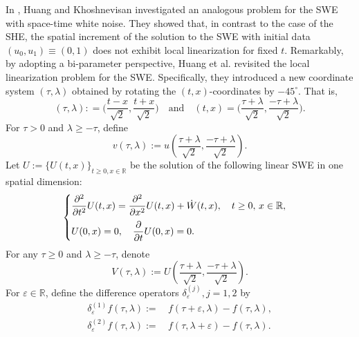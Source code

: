 \documentclass[11pt,reqno]{amsart}
\numberwithin{equation}{section}
\newcommand{\1}{{\bf 1}}
\newcommand{\2}{{\bf 2}}
\begin{document}
  
  
In \cite{HK2016}, Huang and Khoshnevisan  investigated  an analogous problem  for the  SWE with space-time white noise.  They showed that, in contrast to the case of the SHE,  the spatial increment of the  solution to  the SWE with initial data $(u_0, u_1) \equiv (0, 1)$ does not  exhibit local linearization  for fixed $t$.   Remarkably, by adopting a bi-parameter perspective, Huang  et al.   \cite{HOO2024}   revisited the local linearization problem  for  the SWE.   Specifically, they introduced  a new coordinate system $(\tau, \lambda)$ obtained by rotating the $(t, x)$-coordinates by $-45^\circ$.  That is, 
\begin{equation}\label{eq transform}
(\tau, \lambda): = \Big(\frac{t-x}{\sqrt{2}}, \frac{t+x}{\sqrt{2}}\Big) \quad \text{and} \quad (t, x) 
= \Big( \frac{\tau+\lambda}{\sqrt{2}}, 
\frac{-\tau+\lambda}{\sqrt{2}} \Big). 
\end{equation}
For $\tau>0$ and $\lambda\ge -\tau$,  define 
\begin{equation}\label{SWE 2}
v(\tau, \lambda) := u\left(\frac{\tau+\lambda}{\sqrt{2}}, \frac{-\tau+\lambda}{\sqrt{2}}\right). 
\end{equation}
  Let $U:=\{U(t,x)\}_{t\ge0, x\in \mathbb R}$ be the solution of the following  linear SWE in one spatial dimension:
      \begin{equation}\label{SWE linear}
\begin{cases}
\vspace{6pt}
\displaystyle{\frac{\partial^2}{\partial t^2}U(t, x) =\frac{\partial^2}{\partial x^2} U(t, x) +   \dot W(t, x), \quad t\ge 0, \, x \in \mathbb{R},}\\
\displaystyle{U(0, x) = 0, \quad \frac{\partial}{\partial t} U(0, x) = 0.}
\end{cases}
\end{equation}
 For any $\tau\ge 0$ and $\lambda\ge -\tau$,  denote 
\begin{equation}\label{SWE 3}
V(\tau, \lambda) := U\left(\frac{\tau+\lambda}{\sqrt{2}}, \frac{-\tau+\lambda}{\sqrt{2}}\right). 
\end{equation}
 For $\varepsilon \in \mathbb R$, define the difference operators $\delta_{\varepsilon}^{(j)}, j=1, 2$  by  
\begin{equation}\label{eq diff}
 \begin{split}
 \delta_{\varepsilon}^{(1)}f(\tau, \lambda):=&\, f(\tau+\varepsilon, \lambda)-f(\tau, \lambda),\\
   \delta_{\varepsilon}^{(2)}f(\tau, \lambda):=&\, f(\tau, \lambda+\varepsilon)-f(\tau, \lambda).
 \end{split}
 \end{equation} 
\end{document}
